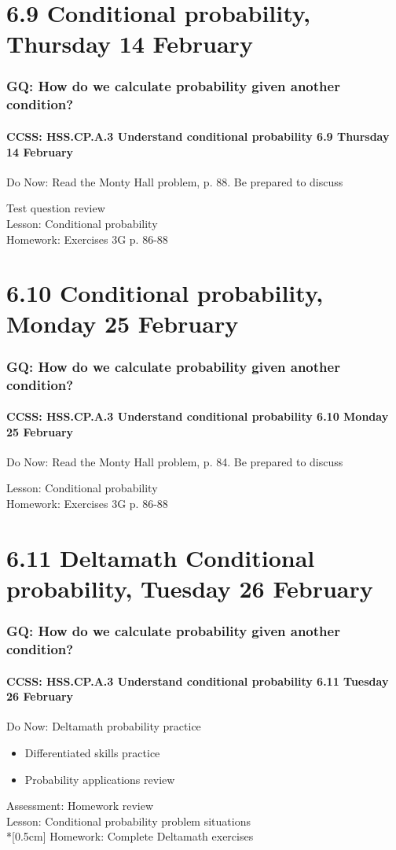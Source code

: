 \documentclass{beamer}
\begin{document}
\section{6.9 Conditional probability, Thursday 14 February}
  \frame
  {
    \frametitle{GQ: How do we calculate probability given another condition?}
    \framesubtitle{CCSS: HSS.CP.A.3 Understand conditional probability \hfill \alert{6.9 Thursday 14 February}}

    \begin{block}{Do Now: Read the Monty Hall problem, p. 88. Be prepared to discuss}
    \end{block}
    Test question review\\
    Lesson: Conditional probability\\[0.5cm]
    Homework: Exercises 3G p. 86-88
  }

\section{6.10 Conditional probability, Monday 25 February}
  \frame
  {
    \frametitle{GQ: How do we calculate probability given another condition?}
    \framesubtitle{CCSS: HSS.CP.A.3 Understand conditional probability \hfill \alert{6.10 Monday 25 February}}

    \begin{block}{Do Now: Read the Monty Hall problem, p. 84. Be prepared to discuss}
    \end{block}
    Lesson: Conditional probability\\[0.5cm]
    Homework: Exercises 3G p. 86-88
  }

\section{6.11 Deltamath Conditional probability, Tuesday 26 February}
  \frame
  {
    \frametitle{GQ: How do we calculate probability given another condition?}
    \framesubtitle{CCSS: HSS.CP.A.3 Understand conditional probability \hfill \alert{6.11 Tuesday 26 February}}

    \begin{block}{Do Now: Deltamath probability practice}
      \begin{itemize}
        \item Differentiated skills practice
        \item Probability applications review
      \end{itemize}
    \end{block}
    Assessment: Homework review\\
    Lesson: Conditional probability problem situations\\*[0.5cm]
    Homework: Complete Deltamath exercises
  }
\end{document}
